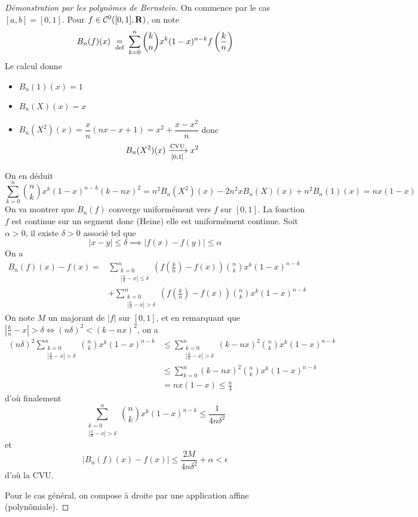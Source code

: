 \begin{proof}[Démonstration par les polynômes de Bernstein]
    On commence par le cas $[a, b]=[0, 1]$. Pour $f \in  \mathcal  C^0([0, 1], \mathbf R)$, on note \[
        B_n(f)(x)\;\underset{\text{def}}=\; \sum_{k=0}^{n} \binom knx^k(1-x)^{n-k}f\left( \frac{k}{n} \right) 
    \] 
    Le calcul donne \begin{itemize}
        \item $B_n(1)(x)=1$
        \item  $B_n(X)(x)=x$
        \item  $B_n(X^2)(x)=\dfrac{x}{n}(nx-x+1)=x^2+\dfrac{x-x^2}{n}$ donc \[
                B_n(X^2)(x) \xrightarrow[ \detokenize{[0, 1]} ]{\text{CVU}} x^2
        \]
    \end{itemize}
    On en déduit \[
        \sum_{k=0}^{n} \binom nkx^k(1-x)^{n-k}(k-nx)^2=n^2B_n(X^2)(x)-2n^2xB_n(X)(x)+n^2B_n(1)(x)=nx(1-x)
    \] 
    On va montrer que $B_n(f)$ converge uniformément vers  $f$ sur $[0, 1]$. La fonction $f$ est continue sur un segment donc (Heine) elle est uniformément continue. Soit  $\alpha>0$, il existe  $\delta>0$ associé tel que  \[
        |x-y|\leq \delta \implies |f(x)-f(y)|\leq \alpha
    \] 
    On a \begin{align*}
        B_n(f)(x)-f(x)= &\sum_{\substack{k=0\\|\frac{k}{n}-x|\leq \delta}}^{n} \left( f\left( \frac{k}{n} \right)-f(x)  \right) \binom nkx^k(1-x)^{n-k} \\
                        &+\sum_{\substack{k=0\\|\frac{k}{n}-x|> \delta}}^n \left( f\left( \frac{k}{n} \right)-f(x)  \right) \binom nkx^k(1-x)^{n-k}
    \end{align*}
    On note $M$ un majorant de  $|f|$ sur  $[0, 1]$, et en remarquant que $ \left| \frac{k}{n}-x \right|>\delta \iff  (n\delta)^2<(k-nx)^2$, on a \begin{align*}
            (n\delta)^2 \sum_{\substack{k=0\\|\frac{k}{n}-x|> \delta}}^n \binom nk x^k(1-x)^{n-k}&\leq \sum_{\substack{k=0\\|\frac{k}{n}-x|> \delta}}^n(k-nx)^2 \binom nk x^k(1-x)^{n-k} \\
                                                                                                 &\leq  \sum_{k=0}^n(k-nx)^2 \binom nk x^k(1-x)^{n-k} \\
                                                                                                 &=nx(1-x)\leq \frac{n}{4}
        \end{align*}
        d'où finalement \[
            \sum_{\substack{k=0\\|\frac{k}{n}-x|> \delta}}^n \binom nk x^k(1-x)^{n-k}\leq \frac{1}{4n\delta^2}
        \] 
        et \[
            \left| B_n(f)(x)-f(x) \right|\leq \frac{2M}{4n\delta^2}+\alpha<\epsilon
        \] 
        d'où la CVU.

        Pour le cas général, on compose à droite par une application affine (polynômiale).
\end{proof}

